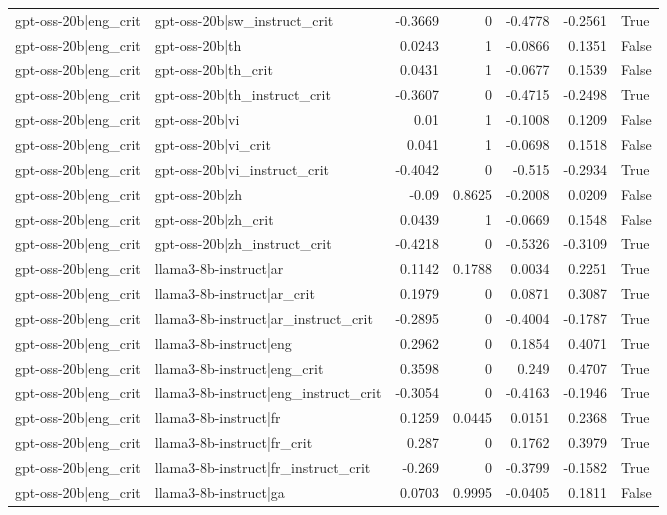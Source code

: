 \begin{table}
\begin{tabular}{l l r r r r l}
gpt-oss-20b|eng_crit & gpt-oss-20b|sw_instruct_crit & -0.3669 & 0 & -0.4778 & -0.2561 & True \\
gpt-oss-20b|eng_crit & gpt-oss-20b|th & 0.0243 & 1 & -0.0866 & 0.1351 & False \\
gpt-oss-20b|eng_crit & gpt-oss-20b|th_crit & 0.0431 & 1 & -0.0677 & 0.1539 & False \\
gpt-oss-20b|eng_crit & gpt-oss-20b|th_instruct_crit & -0.3607 & 0 & -0.4715 & -0.2498 & True \\
gpt-oss-20b|eng_crit & gpt-oss-20b|vi & 0.01 & 1 & -0.1008 & 0.1209 & False \\
gpt-oss-20b|eng_crit & gpt-oss-20b|vi_crit & 0.041 & 1 & -0.0698 & 0.1518 & False \\
gpt-oss-20b|eng_crit & gpt-oss-20b|vi_instruct_crit & -0.4042 & 0 & -0.515 & -0.2934 & True \\
gpt-oss-20b|eng_crit & gpt-oss-20b|zh & -0.09 & 0.8625 & -0.2008 & 0.0209 & False \\
gpt-oss-20b|eng_crit & gpt-oss-20b|zh_crit & 0.0439 & 1 & -0.0669 & 0.1548 & False \\
gpt-oss-20b|eng_crit & gpt-oss-20b|zh_instruct_crit & -0.4218 & 0 & -0.5326 & -0.3109 & True \\
gpt-oss-20b|eng_crit & llama3-8b-instruct|ar & 0.1142 & 0.1788 & 0.0034 & 0.2251 & True \\
gpt-oss-20b|eng_crit & llama3-8b-instruct|ar_crit & 0.1979 & 0 & 0.0871 & 0.3087 & True \\
gpt-oss-20b|eng_crit & llama3-8b-instruct|ar_instruct_crit & -0.2895 & 0 & -0.4004 & -0.1787 & True \\
gpt-oss-20b|eng_crit & llama3-8b-instruct|eng & 0.2962 & 0 & 0.1854 & 0.4071 & True \\
gpt-oss-20b|eng_crit & llama3-8b-instruct|eng_crit & 0.3598 & 0 & 0.249 & 0.4707 & True \\
gpt-oss-20b|eng_crit & llama3-8b-instruct|eng_instruct_crit & -0.3054 & 0 & -0.4163 & -0.1946 & True \\
gpt-oss-20b|eng_crit & llama3-8b-instruct|fr & 0.1259 & 0.0445 & 0.0151 & 0.2368 & True \\
gpt-oss-20b|eng_crit & llama3-8b-instruct|fr_crit & 0.287 & 0 & 0.1762 & 0.3979 & True \\
gpt-oss-20b|eng_crit & llama3-8b-instruct|fr_instruct_crit & -0.269 & 0 & -0.3799 & -0.1582 & True \\
gpt-oss-20b|eng_crit & llama3-8b-instruct|ga & 0.0703 & 0.9995 & -0.0405 & 0.1811 & False \\

\end{tabular}
\end{table}
